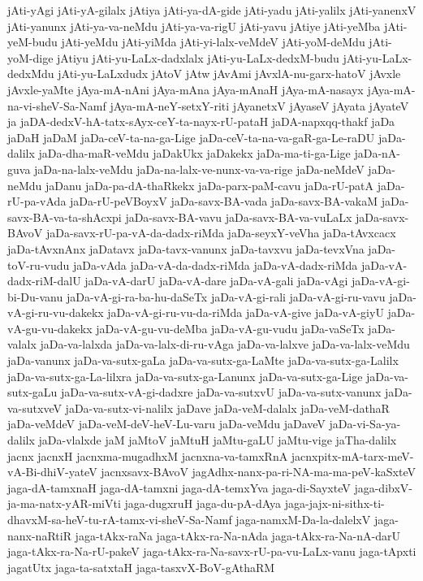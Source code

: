{jAti-yAgi
jAti-yA-gilalx
jAtiya
jAti-ya-dA-gide
jAti-yadu
jAti-yalilx
jAti-yanenxV
jAti-yanunx
jAti-ya-va-neMdu
jAti-ya-va-rigU
jAti-yavu
jAtiye
jAti-yeMba
jAti-yeM-budu
jAti-yeMdu
jAti-yiMda
jAti-yi-lalx-veMdeV
jAti-yoM-deMdu
jAti-yoM-dige
jAtiyu
jAti-yu-LaLx-dadxlalx
jAti-yu-LaLx-dedxM-budu
jAti-yu-LaLx-dedxMdu
jAti-yu-LaLxdudx
jAtoV
jAtw
jAvAmi
jAvxlA-nu-garx-hatoV
jAvxle
jAvxle-yaMte
jAya-mA-nAni
jAya-mAna
jAya-mAnaH
jAya-mA-nasayx
jAya-mA-na-vi-sheV-Sa-Namf
jAya-mA-neY-setxY-riti
jAyanetxV
jAyaseV
jAyata
jAyateV
ja
jaDA-dedxV-hA-tatx-sAyx-ceY-ta-nayx-rU-pataH
jaDA-napxqq-thakf
jaDa
jaDaH
jaDaM
jaDa-ceV-ta-na-ga-Lige
jaDa-ceV-ta-na-va-gaR-ga-Le-raDU
jaDa-dalilx
jaDa-dha-maR-veMdu
jaDakUkx
jaDakekx
jaDa-ma-ti-ga-Lige
jaDa-nA-guva
jaDa-na-lalx-veMdu
jaDa-na-lalx-ve-nunx-va-va-rige
jaDa-neMdeV
jaDa-neMdu
jaDanu
jaDa-pa-dA-thaRkekx
jaDa-parx-paM-cavu
jaDa-rU-patA
jaDa-rU-pa-vAda
jaDa-rU-peVBoyxV
jaDa-savx-BA-vada
jaDa-savx-BA-vakaM
jaDa-savx-BA-va-ta-shAcxpi
jaDa-savx-BA-vavu
jaDa-savx-BA-va-vuLaLx
jaDa-savx-BAvoV
jaDa-savx-rU-pa-vA-da-dadx-riMda
jaDa-seyxY-veVha
jaDa-tAvxcacx
jaDa-tAvxnAnx
jaDatavx
jaDa-tavx-vanunx
jaDa-tavxvu
jaDa-tevxVna
jaDa-toV-ru-vudu
jaDa-vAda
jaDa-vA-da-dadx-riMda
jaDa-vA-dadx-riMda
jaDa-vA-dadx-riM-dalU
jaDa-vA-darU
jaDa-vA-dare
jaDa-vA-gali
jaDa-vAgi
jaDa-vA-gi-bi-Du-vanu
jaDa-vA-gi-ra-ba-hu-daSeTx
jaDa-vA-gi-rali
jaDa-vA-gi-ru-vavu
jaDa-vA-gi-ru-vu-dakekx
jaDa-vA-gi-ru-vu-da-riMda
jaDa-vA-give
jaDa-vA-giyU
jaDa-vA-gu-vu-dakekx
jaDa-vA-gu-vu-deMba
jaDa-vA-gu-vudu
jaDa-vaSeTx
jaDa-valalx
jaDa-va-lalxda
jaDa-va-lalx-di-ru-vAga
jaDa-va-lalxve
jaDa-va-lalx-veMdu
jaDa-vanunx
jaDa-va-sutx-gaLa
jaDa-va-sutx-ga-LaMte
jaDa-va-sutx-ga-Lalilx
jaDa-va-sutx-ga-La-lilxra
jaDa-va-sutx-ga-Lanunx
jaDa-va-sutx-ga-Lige
jaDa-va-sutx-gaLu
jaDa-va-sutx-vA-gi-dadxre
jaDa-va-sutxvU
jaDa-va-sutx-vanunx
jaDa-va-sutxveV
jaDa-va-sutx-vi-nalilx
jaDave
jaDa-veM-dalalx
jaDa-veM-dathaR
jaDa-veMdeV
jaDa-veM-deV-heV-Lu-varu
jaDa-veMdu
jaDaveV
jaDa-vi-Sa-ya-dalilx
jaDa-vlalxde
jaM
jaMtoV
jaMtuH
jaMtu-gaLU
jaMtu-vige
jaTha-dalilx
jacnx
jacnxH
jacnxma-mugadhxM
jacnxna-va-tamxRnA
jacnxpitx-mA-tarx-meV-vA-Bi-dhiV-yateV
jacnxsavx-BAvoV
jagAdhx-nanx-pa-ri-NA-ma-ma-peV-kaSxteV
jaga-dA-tamxnaH
jaga-dA-tamxni
jaga-dA-temxYva
jaga-di-SayxteV
jaga-dibxV-ja-ma-natx-yAR-miVti
jaga-dugxruH
jaga-du-pA-dAya
jaga-jajx-ni-sithx-ti-dhavxM-sa-heV-tu-rA-tamx-vi-sheV-Sa-Namf
jaga-namxM-Da-la-dalelxV
jaga-nanx-naRtiR
jaga-tAkx-raNa
jaga-tAkx-ra-Na-nAda
jaga-tAkx-ra-Na-nA-darU
jaga-tAkx-ra-Na-rU-pakeV
jaga-tAkx-ra-Na-savx-rU-pa-vu-LaLx-vanu
jaga-tApxti
jagatUtx
jaga-ta-satxtaH
jaga-tasxvX-BoV-gAthaRM
}
